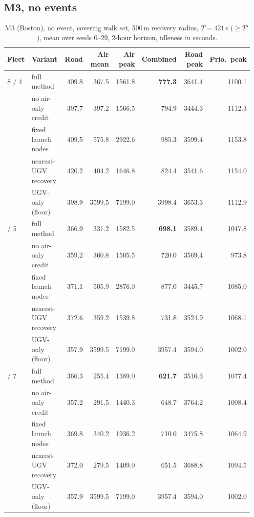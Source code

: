 \documentclass[11pt]{article}
\theoremstyle{definition}
\theoremstyle{plain}
\begin{document}
\subsection{M3, no events}

\begin{table}[H]
\centering
\small
\caption{M3 (Boston), no event, covering walk set, 500\,m recovery radius, $T = 421$\,s ($\geq T^\star$), mean over seeds 0--29, 2-hour horizon, idleness in seconds.}
\label{tab:m3}
\begin{tabular}{llrrrrrr}
\toprule
Fleet & Variant & Road & Air mean & Air peak & Combined & Road peak & Prio.\ peak \\
\midrule
8 / 4 & full method & 409.8 & 367.5 & 1561.8 & \textbf{777.3} & 3641.4 & 1100.1 \\
 & no air-only credit & 397.7 & 397.2 & 1566.5 & 794.9 & 3444.3 & 1112.3 \\
 & fixed launch nodes & 409.5 & 575.8 & 2922.6 & 985.3 & 3599.4 & 1153.8 \\
 & nearest-UGV recovery & 420.2 & 404.2 & 1646.8 & 824.4 & 3541.6 & 1154.0 \\
 & UGV-only (floor) & 398.9 & 3599.5 & 7199.0 & 3998.4 & 3653.3 & 1112.9 \\
\addlinespace
10 / 5 & full method & 366.9 & 331.2 & 1582.5 & \textbf{698.1} & 3589.4 & 1047.8 \\
 & no air-only credit & 359.2 & 360.8 & 1505.5 & 720.0 & 3569.4 & 973.8 \\
 & fixed launch nodes & 371.1 & 505.9 & 2876.0 & 877.0 & 3445.7 & 1085.0 \\
 & nearest-UGV recovery & 372.6 & 359.2 & 1539.8 & 731.8 & 3524.9 & 1068.1 \\
 & UGV-only (floor) & 357.9 & 3599.5 & 7199.0 & 3957.4 & 3594.0 & 1002.0 \\
\addlinespace
10 / 7 & full method & 366.3 & 255.4 & 1389.0 & \textbf{621.7} & 3516.3 & 1077.4 \\
 & no air-only credit & 357.2 & 291.5 & 1440.3 & 648.7 & 3764.2 & 1008.4 \\
 & fixed launch nodes & 369.8 & 340.2 & 1936.2 & 710.0 & 3475.8 & 1064.9 \\
 & nearest-UGV recovery & 372.0 & 279.5 & 1409.0 & 651.5 & 3688.8 & 1094.5 \\
 & UGV-only (floor) & 357.9 & 3599.5 & 7199.0 & 3957.4 & 3594.0 & 1002.0 \\
\bottomrule
\end{tabular}
\end{table}
\end{document}
